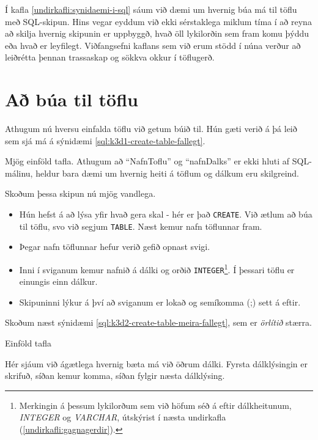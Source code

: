 Í kafla \ref{undirkafli:synidaemi-i-sql} sáum við dæmi um hvernig búa má til töflu með SQL-skipun. Hins vegar eyddum við ekki sérstaklega miklum tíma í að reyna að skilja hvernig skipunin er uppbyggð, hvað öll lykilorðin sem fram komu þýddu eða hvað er leyfilegt. Viðfangsefni kaflans sem við erum stödd í núna verður að leiðrétta þennan trassaskap og sökkva okkur í töflugerð.
\section{Að búa til töflu} %
\label{undirkafli:bua-til-toflu}
Athugum nú hversu einfalda töflu við getum búið til. Hún gæti verið á þá leið sem sjá má á sýnidæmi \ref{sql:k3d1-create-table-fallegt}.

\begin{example}
\caption[Mjög einföld tafla]{Mjög einföld tafla. Athugum að ``NafnToflu'' og ``nafnDalks'' er ekki hluti af SQL-málinu, heldur bara dæmi um hvernig heiti á töflum og dálkum eru skilgreind.}
\label{sql:k3d1-create-table-fallegt}
\centering
{}
\end{example}

Skoðum þessa skipun nú mjög vandlega.
\begin{itemize}
 \item Hún hefst á að lýsa yfir hvað gera skal - hér er það \verb|CREATE|. Við ætlum að búa til töflu, svo við segjum \verb|TABLE|. Næst kemur nafn töflunnar fram.
 \item Þegar nafn töflunnar hefur verið gefið opnast svigi.
 \item Inni í sviganum kemur nafnið á dálki og orðið \verb|INTEGER|\footnote{Merkingin á þessum lykilorðum sem við höfum séð á eftir dálkheitunum, \emph{INTEGER} og \emph{VARCHAR}, útskýrist í næsta undirkafla (\ref{undirkafli:gagnagerdir}).}. Í þessari töflu er einungis einn dálkur.
 \item Skipuninni lýkur á því að sviganum er lokað og semíkomma (;) sett á eftir.
\end{itemize}

Skoðum næst sýnidæmi \ref{sql:k3d2-create-table-meira-fallegt}, sem er \emph{örlítið} stærra.
\begin{example}
\caption{Einföld tafla}
\label{sql:k3d2-create-table-meira-fallegt}
\centering
{}
\end{example}

Hér sjáum við ágætlega hvernig bæta má við öðrum dálki. Fyrsta dálklýsingin er skrifuð, síðan kemur komma, síðan fylgir næsta dálklýsing.

